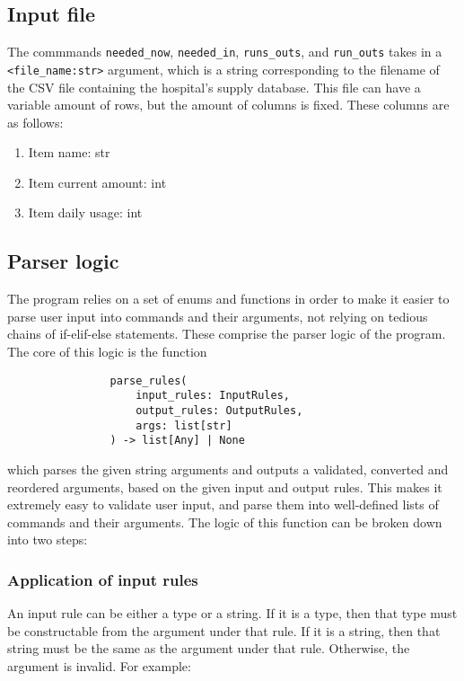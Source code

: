 \documentclass{article}
\begin{document}
		\subsection{Input file}
			The commmands \verb|needed_now|, \verb|needed_in|, \verb|runs_outs|, and
			\verb|run_outs| takes in a \verb|<file_name:str>| argument, which is a
			string corresponding to the filename of the CSV file containing the hospital's
			supply database. This file can have a variable amount of rows, but the amount of
			columns is fixed. These columns are as follows:

			\begin{enumerate}
				\item Item name: str
				\item Item current amount: int
				\item Item daily usage: int
			\end{enumerate}

		\subsection{Parser logic}
			The program relies on a set of enums and functions in order to make it
			easier to parse user input into commands and their arguments, not relying on tedious
			chains of if-elif-else statements. These comprise the parser logic of the program.
			The core of this logic is the function

			\begin{verbatim}
				parse_rules(
					input_rules: InputRules,
					output_rules: OutputRules,
					args: list[str]
				) -> list[Any] | None
			\end{verbatim}

			which parses the given string arguments and outputs a validated, converted and
			reordered arguments, based on the given input and output rules. This makes it
			extremely easy to validate user input, and parse them into well-defined lists
			of commands and their arguments. The logic of this function can be broken down into
			two steps:

			\subsubsection{Application of input rules}
				An input rule can be either a type or a string. If it is a type, then that type
				must be constructable from the argument under that rule. If it is a string, then
				that string must be the same as the argument under that rule. Otherwise, the
				argument is invalid. For example:
\end{document}
